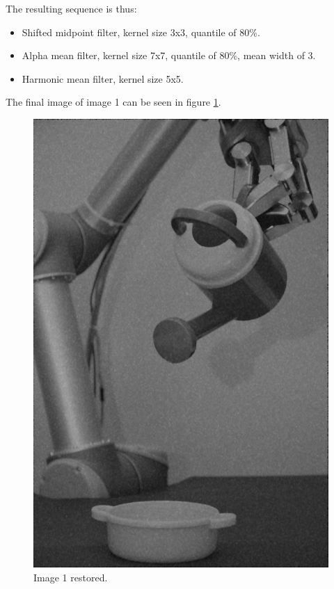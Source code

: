 The resulting sequence is thus:
\begin{itemize}
 \item Shifted midpoint filter, kernel size 3x3, quantile of 80\%.
 \item Alpha mean filter, kernel size 7x7, quantile of 80\%, mean width of 3.
 \item Harmonic mean filter, kernel size 5x5.
\end{itemize}

The final image of image 1 can be seen in figure \ref{fig:final_image1}.

\begin{figure}[H]
\centering
\includegraphics[width = \fullImageWidth]{../code/images/image_result_1.png}
\caption{Image 1 restored.}
\label{fig:final_image1}
\end{figure}
